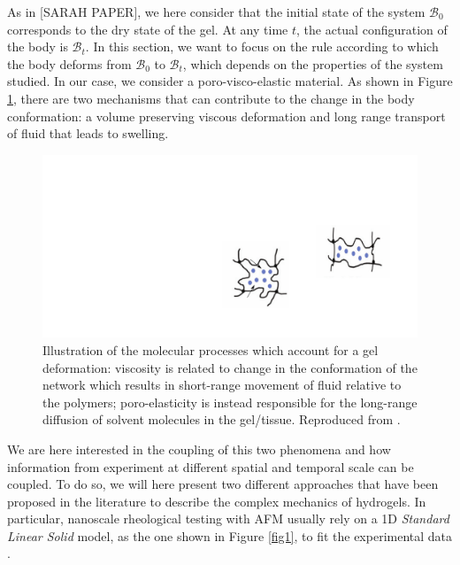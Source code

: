 \documentclass[runningheads]{llncs}
\begin{document}
As in [SARAH PAPER], we here consider that the initial state of the system $\mathcal{B}_0$ corresponds to the dry state of the gel. At any time $t$, the actual configuration of the body is $\mathcal{B}_t$. In this section, we want to focus on the rule according to which the body deforms from $\mathcal{B}_0$ to $\mathcal{B}_t$, which depends on the properties of the system studied. In our case, we consider a poro-visco-elastic material. As shown in Figure \ref{deformation}, there are two mechanisms that can contribute to the change in the body conformation: a volume preserving viscous deformation and long range transport of fluid that leads to swelling. 

\begin{figure}[h!]
	\centering
	\includegraphics[scale=0.325]{images/visco_poro}
	\caption{Illustration of the molecular processes which account for a gel deformation: viscosity is related to change in the conformation of the network which results in short-range movement of fluid relative to the polymers; poro-elasticity is instead responsible for the long-range diffusion of solvent molecules in the gel/tissue. Reproduced from \cite{viscoporo}.}
	\label{deformation}
\end{figure}
 
We are here interested in the coupling of this two phenomena and how information from experiment at different spatial and temporal scale can be coupled. To do so, we will here present two different approaches that have been proposed in the literature to describe the complex mechanics of hydrogels. In particular, nanoscale rheological testing with AFM usually rely on a 1D \textit{Standard Linear Solid} model, as the one shown in Figure \ref{fig1}, to fit the experimental data \cite{Article1,viscoporo}.  
\end{document}
